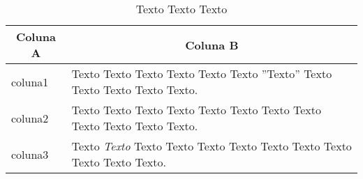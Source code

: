 

\begin{table}[ht]
\caption{Texto Texto Texto}
\label{tbl:tabelaex2}
\centering
{}
\begin{tabular}{p{6cm}p{9cm}}
\hline
\multicolumn{1}{c}{\textbf{Coluna A}} & \multicolumn{1}{c}{\textbf{Coluna B}}  \\
\hline 
coluna1 & Texto Texto Texto Texto Texto Texto ''Texto'' Texto Texto Texto Texto Texto.
\\ 

coluna2 & Texto Texto Texto Texto Texto Texto Texto Texto Texto Texto Texto Texto.              
\\

coluna3 & Texto \textit{Texto} Texto Texto Texto Texto Texto Texto Texto Texto Texto Texto.     
\\ \hline

\end{tabular}

\fontepesquisa
\end{table}
